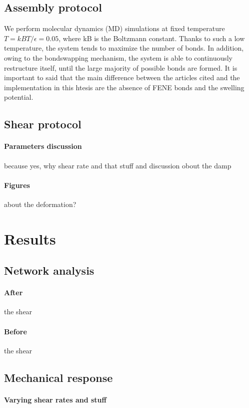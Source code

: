 \subsection{Assembly protocol}

We perform molecular dynamics (MD) simulations at fixed temperature $T = kBT/\epsilon = 0.05$, where kB is the Boltzmann constant. 
Thanks to such a low temperature, the system tends to maximize the number of bonds. 
In addition, owing to the bondswapping mechanism, the system is able to continuously restructure itself, until the large majority of possible bonds are formed.
It is important to said that the main difference between the articles cited and the implementation in this htesis are the absence of FENE bonds and the swelling potential.

\subsection{Shear protocol}

\paragraph{Parameters discussion} because yes, why shear rate and that stuff and discussion obout the damp

\paragraph{Figures} about the deformation?

\section{Results}\label{ch3:Results}

\subsection{Network analysis}

\paragraph{After} the shear

\paragraph{Before} the shear

\subsection{Mechanical response}

\paragraph{Varying shear rates and stuff}

\newpage
